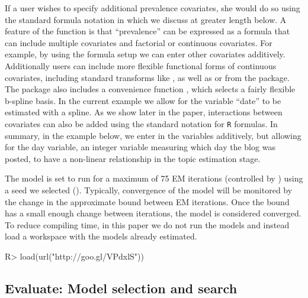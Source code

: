 \documentclass[article,shortnames]{jss}
\begin{document}
If a user wishes to specify additional prevalence covariates, she would do so using the standard formula notation in  which we discuss at greater length below. A feature of the  function is that ``prevalence'' can be expressed as a formula that can include multiple covariates and factorial or continuous covariates.  For example, by using the formula setup we can enter other covariates additively. Additionally users can include more flexible functional forms of continuous covariates, including standard transforms like , as well as  or  from the  package. The  package also includes a convenience function , which selects a fairly flexible b-spline basis. In the current example we allow for the variable ``date'' to be estimated with a spline. As we show later in the paper, interactions between covariates can also be added using the standard notation for \texttt{R} formulas. In summary, in the example below, we enter in the variables additively, but allowing for the day variable, an integer variable measuring which day the blog was posted, to have a non-linear relationship in the topic estimation stage.

\begin{Schunk}
\end{Schunk}

The model is set to run for a maximum of 75 EM iterations (controlled by ) using a seed we selected ().  Typically, convergence of the model will be monitored by the change in the approximate bound between EM iterations.  Once the bound has a small enough change between iterations, the model is considered converged. To reduce compiling time, in this paper we do not run the models and instead load a workspace with the models already estimated.

\begin{Schunk}
\begin{Sinput}
R> load(url("http://goo.gl/VPdxlS"))
\end{Sinput}
\end{Schunk}

\subsection{Evaluate: Model selection and search}
\end{document}
